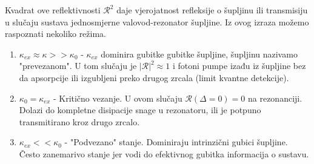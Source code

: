 Kvadrat ove reflektivnosti $\mathcal{R}^2$ daje vjerojatnost refleksije o šupljinu ili transmisiju u slučaju sustava jednosmjerne valovod-rezonator šupljine.
Iz ovog izraza možemo raspoznati nekoliko režima. 
\begin{enumerate}
	\item $\kappa_{ex} \approx \kappa >>\kappa_0$ - $\kappa_{ex}$ dominira gubitke gubitke šupljine, šupljinu nazivamo "prevezanom". U tom slučaju je $|\mathcal{R}|^2 \approx 1$ 
i fotoni pumpe izađu iz šupljine bez da apsorpcije ili izgubljeni preko drugog zrcala (limit kvantne detekcije).
	\item  $\kappa_0 = \kappa_{ex}$ - Kritično vezanje. U ovom slučaju $\mathcal{R} (\Delta = 0) = 0$ na rezonanciji. Dolazi do kompletne disipacije snage u rezonatoru, ili je potpuno transmitirano kroz drugo zrcalo.
	\item $\kappa_{ex} << \kappa_0$ - "Podvezano" stanje. Dominiraju intrinzični gubici šupljine. Često zanemarivo stanje jer vodi do efektivnog gubitka informacija o sustavu.
\end{enumerate}

